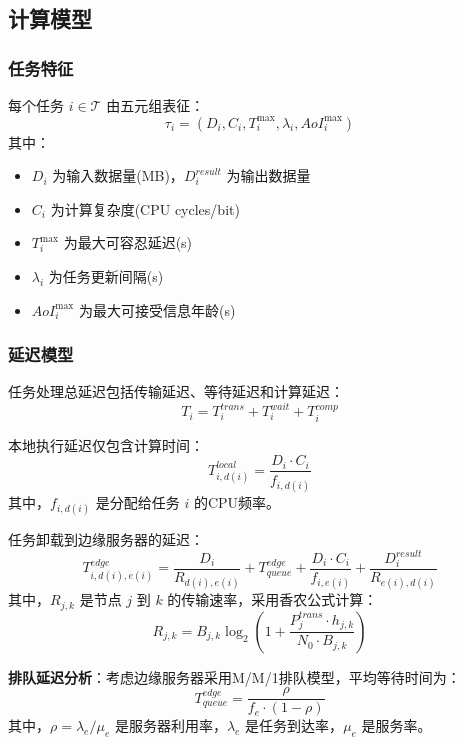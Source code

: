 \documentclass[conference]{IEEEtran}
\begin{document}
\subsection{计算模型}
\subsubsection{任务特征}
每个任务 $i \in \mathcal{T}$ 由五元组表征：
\begin{equation}
\tau_i = (D_i, C_i, T_i^{\max}, \lambda_i, AoI_i^{\max})
\end{equation}
其中：
\begin{itemize}
    \item $D_i$ 为输入数据量(MB)，$D_i^{result}$ 为输出数据量
    \item $C_i$ 为计算复杂度(CPU cycles/bit)
    \item $T_i^{\max}$ 为最大可容忍延迟(s)
    \item $\lambda_i$ 为任务更新间隔(s)
    \item $AoI_i^{\max}$ 为最大可接受信息年龄(s)
\end{itemize}

\subsubsection{延迟模型}
任务处理总延迟包括传输延迟、等待延迟和计算延迟：
\begin{equation}
T_i = T_i^{trans} + T_i^{wait} + T_i^{comp}
\end{equation}

本地执行延迟仅包含计算时间：
\begin{equation}
T_{i,d(i)}^{local} = \frac{D_i \cdot C_i}{f_{i,d(i)}}
\end{equation}
其中，$f_{i,d(i)}$ 是分配给任务 $i$ 的CPU频率。

任务卸载到边缘服务器的延迟：
\begin{equation}
T_{i,d(i),e(i)}^{edge} = \frac{D_i}{R_{d(i),e(i)}} + T_{queue}^{edge} + \frac{D_i \cdot C_i}{f_{i,e(i)}} + \frac{D_i^{result}}{R_{e(i),d(i)}}
\end{equation}
其中，$R_{j,k}$ 是节点 $j$ 到 $k$ 的传输速率，采用香农公式计算：
\begin{equation}
R_{j,k} = B_{j,k} \log_2\left(1 + \frac{P_j^{trans} \cdot h_{j,k}}{N_0 \cdot B_{j,k}}\right)
\end{equation}

\textbf{排队延迟分析}：考虑边缘服务器采用M/M/1排队模型，平均等待时间为：
\begin{equation}
T_{queue}^{edge} = \frac{\rho}{f_e \cdot (1-\rho)}
\end{equation}
其中，$\rho = \lambda_e / \mu_e$ 是服务器利用率，$\lambda_e$ 是任务到达率，$\mu_e$ 是服务率。
\end{document}
